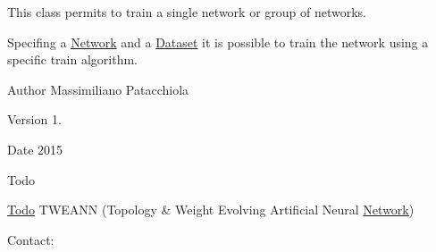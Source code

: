 This class permits to train a single network or group of networks. 

Specifing a \hyperlink{class_network}{Network} and a \hyperlink{class_dataset}{Dataset} it is possible to train the network using a specific train algorithm.

\begin{DoxyAuthor}{Author}
Massimiliano Patacchiola
\end{DoxyAuthor}
\begin{DoxyVersion}{Version}
1.
\end{DoxyVersion}
\begin{DoxyDate}{Date}
2015
\end{DoxyDate}
\begin{DoxyRefDesc}{Todo}
\item[\hyperlink{todo__todo000004}{Todo}]T\-W\-E\-A\-N\-N (Topology \& Weight Evolving Artificial Neural \hyperlink{class_network}{Network})\end{DoxyRefDesc}


Contact\-: 

